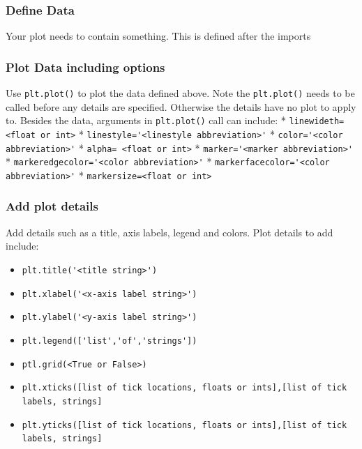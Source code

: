 \documentclass{book}
\providecommand{\tightlist}{%
      \setlength{\itemsep}{0pt}\setlength{\parskip}{0pt}}
\begin{document}
\subsubsection{Define Data}\label{define-data}

Your plot needs to contain something. This is defined after the imports

\subsubsection{Plot Data including
options}\label{plot-data-including-options}

Use \lstinline!plt.plot()! to plot the data defined above. Note the
\lstinline!plt.plot()! needs to be called before any details are
specified. Otherwise the details have no plot to apply to. Besides the
data, arguments in \lstinline!plt.plot()! call can include: *
\lstinline!linewideth= <float or int>! *
\lstinline!linestyle='<linestyle abbreviation>'! *
\lstinline!color='<color abbreviation>'! *
\lstinline!alpha= <float or int>! *
\lstinline!marker='<marker abbreviation>'! *
\lstinline!markeredgecolor='<color abbreviation>'! *
\lstinline!markerfacecolor='<color abbreviation>'! *
\lstinline!markersize=<float or int>!

\subsubsection{Add plot details}\label{add-plot-details}

Add details such as a title, axis labels, legend and colors. Plot
details to add include:

\begin{itemize}
\tightlist
\item
  \lstinline!plt.title('<title string>')!
\item
  \lstinline!plt.xlabel('<x-axis label string>')!
\item
  \lstinline!plt.ylabel('<y-axis label string>')!
\item
  \lstinline!plt.legend(['list','of','strings'])!
\item
  \lstinline!ptl.grid(<True or False>)!
\item
  \lstinline!plt.xticks([list of tick locations, floats or ints],[list of tick labels, strings]!
\item
  \lstinline!plt.yticks([list of tick locations, floats or ints],[list of tick labels, strings]!
\end{itemize}
\end{document}
